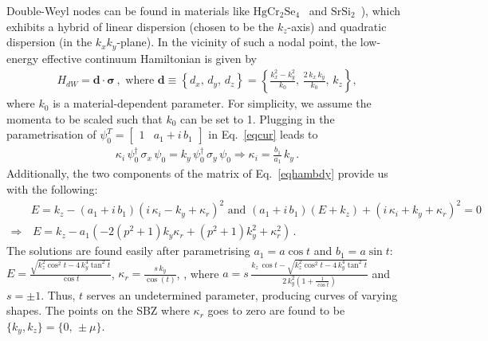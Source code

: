 \documentclass[aps,prb,onecolumn, footinbib, 10pt]{revtex4-2}
\def \nn{\nonumber \\}
\begin{document}
Double-Weyl nodes can be found in materials like $\mathrm{HgCr_2Se_4}$~\cite{Gang2011} and $\mathrm{SrSi_2}$~\cite{hasan_mweyl16, singh18_tunable}), which exhibits a hybrid of linear dispersion (chosen to be the $k_z$-axis) and quadratic dispersion (in the $k_x k_y$-plane). In the vicinity of such a nodal point, the low-energy effective continuum Hamiltonian is given by \cite{bernevig,bernevig2, fu22_thermoelectric, ips_rahul_ph_strain, ips-ruiz, ips-tilted, chen16_thermoelectric}
\begin{align}
\label{eqhamdw}
H_{dW} = \boldsymbol{d} \cdot \boldsymbol{\sigma}  \,, \text{ where }
\boldsymbol{d} \equiv \left\{ d_x,\, d_y, \, d_z \right\} = \left\{
\frac{k_x^2-k_y^2} {k_0} , \, \frac{2 \,k_x \,k_y} {k_0} ,\, k_z\right\} ,
\end{align}
where $k_0$ is a material-dependent parameter. For simplicity, we assume the momenta to be scaled such that $k_0$ can be set to 1.
Plugging in the parametrisation of $ \psi_0^T  = \begin{bmatrix}
1 & a_1 +i \, b_1 \end{bmatrix}$ in Eq.~\eqref{eqcur} leads to
\begin{align}
\kappa_i \,\psi_0^\dagger\, \sigma_x \, \psi_0 
=k_y \, \psi_0^\dagger\, \sigma_y \, \psi_0 \Rightarrow
 \kappa_i = \frac{b_1}{a_1} \,k_y \,.
\end{align}
Additionally, the two components of the matrix of Eq.~\eqref{eqhambdy} provide us with the following:
\begin{align}
&  E = k_z- \left(a_1+i\, b_1\right) \left(i \,\kappa _i-k_y+\kappa _r \right)^2
 \text{ and }
\left(a_1+i \,b_1\right) \left( E + k_z\right)+\left(i \,\kappa _i+k_y+\kappa _r\right)^2 = 0  \nn
\Rightarrow & \, E = k_z -a_1 \left(-2 \left(p^2+1\right) k_y \kappa _r+\left(p^2+1\right) k_y^2
+\kappa _r^2\right)
\,.
\end{align}
The solutions are found easily after parametrising $ a_1 = a \cos t$ and $ b_1 = a \sin t$:
$E = \frac{\sqrt{k_z^2 \cos^2  t-4 \,k_y^4 \tan ^2 t }}
{\cos t}$, $ \kappa _r =  \frac{ s \, k_y}{\cos (t)} $, , where
$a = s \, \frac{ k_z \,\cos t-\sqrt{k_z^2 \cos ^2 t-4 \,k_y^4 \tan^2 t} }
{2\, k_y^2 \left( 1 + \frac{1}{\cos t} \right)}$ and $s = \pm 1$.
Thus, $t$ serves an undetermined parameter, producing curves of varying shapes. The points on the SBZ where $\kappa_r$ goes to zero are found to be $\lbrace k_y, k_z \rbrace = \lbrace  0,\, \pm \mu \rbrace $.
\end{document}
